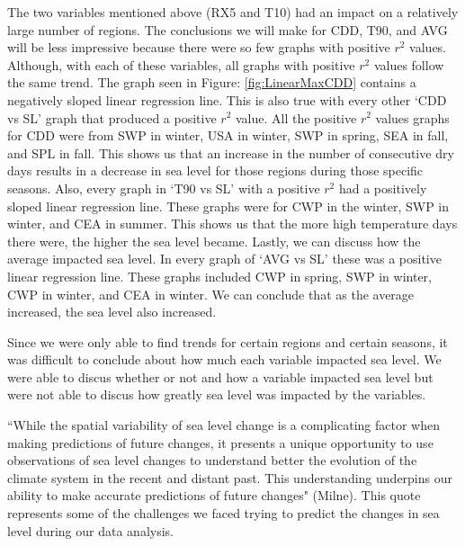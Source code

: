 \documentclass[12pt]{report}
\begin{document}
	\par The two variables mentioned above (RX5 and T10) had an impact on a relatively large number of regions. The conclusions we will make for CDD, T90, and AVG will be less impressive because there were so few graphs with positive $r^2$ values. Although, with each of these variables, all graphs with positive $r^2$ values follow the same trend. The graph seen in Figure: \ref{fig:LinearMaxCDD} contains a negatively sloped linear regression line. This is also true with every other \textquoteleft CDD vs SL' graph that produced a positive $r^2$ value. All the positive $r^2$ values graphs for CDD were from SWP in winter, USA in winter, SWP in spring, SEA in fall, and SPL in fall. This shows us that an increase in the number of consecutive dry days results in a decrease in sea level for those regions during those specific seasons. Also, every graph in \textquoteleft T90 vs SL' with a positive $r^2$ had a positively sloped linear regression line. These graphs were for CWP in the winter, SWP in winter, and CEA in summer. This shows us that the more high temperature days there were, the higher the sea level became. Lastly, we can discuss how the average impacted sea level. In every graph of \textquoteleft AVG vs SL' these was a positive linear regression line. These graphs included CWP in spring, SWP in winter, CWP in winter, and CEA in winter. We can conclude that as the average increased, the sea level also increased.
	\par Since we were only able to find trends for certain regions and certain seasons, it was difficult to conclude about how much each variable impacted sea level. We were able to discus whether or not and how a variable impacted sea level but were not able to discus how greatly sea level was impacted by the variables. 		
	\par \textquotedblleft While the spatial variability of sea level change is a complicating factor when making predictions of future changes, it presents a unique opportunity to use observations of sea level changes to understand better the evolution of the climate system in the recent and distant past. This understanding underpins our ability to make accurate predictions of future changes" (Milne). This quote represents some of the challenges we faced trying to predict the changes in sea level during our data analysis. 
\end{document}
